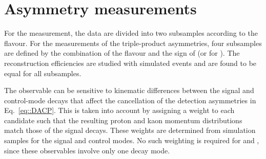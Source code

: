 \section{Asymmetry measurements}
\label{sec:asymmetries}

For the \DACP measurement, the data are divided into two subsamples according to the \Lb flavour. For the measurements of the triple-product asymmetries, four subsamples are defined by the combination of the \Lb flavour and the sign of \CT(or \CTbar for \Lbbar). The reconstruction efficiencies are studied with simulated events and are found to be equal for all subsamples.

The observable \DACP can be sensitive to kinematic differences between the signal and control-mode decays that affect the cancellation of the detection asymmetries in Eq.~\ref{eq::DACP}. This is taken into account by assigning a weight to each \LKJ candidate such that the resulting proton and kaon momentum distributions match those of the signal \LK decays. These weights are determined from simulation samples for the signal and control modes. No such weighting is required for \ACP and \aPTodd, since these observables involve only one decay mode.

